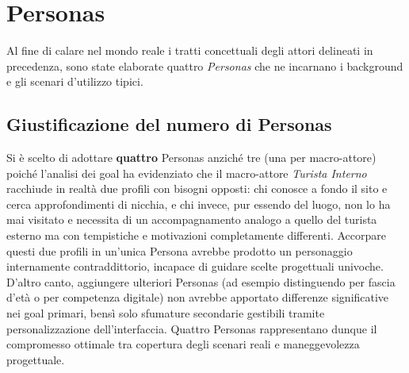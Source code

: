 \section{Personas}

Al fine di calare nel mondo reale i tratti concettuali degli attori delineati in precedenza, sono state elaborate quattro \textit{Personas} che ne incarnano i background e gli scenari d'utilizzo tipici.

\subsection{Giustificazione del numero di Personas}

Si è scelto di adottare \textbf{quattro} Personas anziché tre (una per macro-attore) poiché l'analisi dei goal ha evidenziato che il macro-attore \textit{Turista Interno} racchiude in realtà due profili con bisogni opposti: chi conosce a fondo il sito e cerca approfondimenti di nicchia, e chi invece, pur essendo del luogo, non lo ha mai visitato e necessita di un accompagnamento analogo a quello del turista esterno ma con tempistiche e motivazioni completamente differenti. Accorpare questi due profili in un'unica Persona avrebbe prodotto un personaggio internamente contraddittorio, incapace di guidare scelte progettuali univoche. D'altro canto, aggiungere ulteriori Personas (ad esempio distinguendo per fascia d'età o per competenza digitale) non avrebbe apportato differenze significative nei goal primari, bensì solo sfumature secondarie gestibili tramite personalizzazione dell'interfaccia. Quattro Personas rappresentano dunque il compromesso ottimale tra copertura degli scenari reali e maneggevolezza progettuale.

